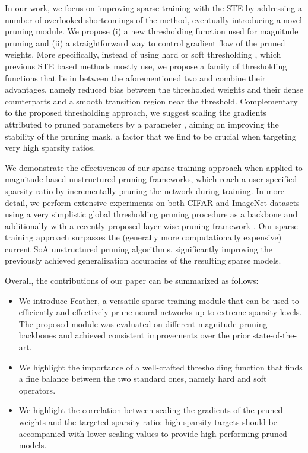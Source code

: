 \documentclass{article}
\begin{document}
In our work, we focus on improving sparse training with the STE by addressing a number of overlooked shortcomings of the method, eventually introducing a novel pruning module. We propose (i) 
a new thresholding function used for magnitude pruning and (ii) a straightforward way to control gradient flow of the pruned weights. 
More specifically, instead of using hard or soft thresholding \cite{donoho1995noising}, which previous STE based methods mostly use, we propose a family of thresholding functions that lie in between the aforementioned two and combine their advantages, namely reduced bias between the thresholded weights and their dense counterparts and a smooth transition region near the threshold. 
Complementary to the proposed thresholding approach, we suggest scaling the gradients attributed to pruned parameters by a parameter , aiming on improving the stability of the pruning mask, a factor that we find to be crucial when targeting very high sparsity ratios.

We demonstrate the effectiveness of our sparse training approach when applied to magnitude based unstructured pruning frameworks, which reach a user-specified sparsity ratio by incrementally pruning the network during training. In more detail, we perform extensive experiments on both CIFAR \cite{krizhevsky2009learning} and ImageNet \cite{deng2009imagenet} datasets using a very simplistic global thresholding pruning procedure as a backbone and additionally with a recently proposed layer-wise pruning framework \cite{retsinas2021online}. Our sparse training approach surpasses the (generally more computationally expensive) current SoA unstructured pruning algorithms, significantly improving the previously achieved generalization accuracies of the resulting sparse models.  

Overall, the contributions of our paper can be summarized as follows: 
\begin{itemize}
    \item 
    We introduce Feather, a versatile sparse training module that can be used to efficiently and effectively prune neural networks up to extreme sparsity   levels. 
    The proposed module was evaluated on different magnitude pruning backbones and achieved consistent improvements over the prior state-of-the-art.
    \item We highlight the importance of a well-crafted thresholding function that finds a fine balance between the two standard ones, namely hard and soft operators.
    \item We highlight the correlation between scaling the gradients of the pruned weights and the targeted sparsity ratio: high sparsity targets should be accompanied with lower scaling values to provide high performing pruned models.
\end{itemize}
\end{document}

